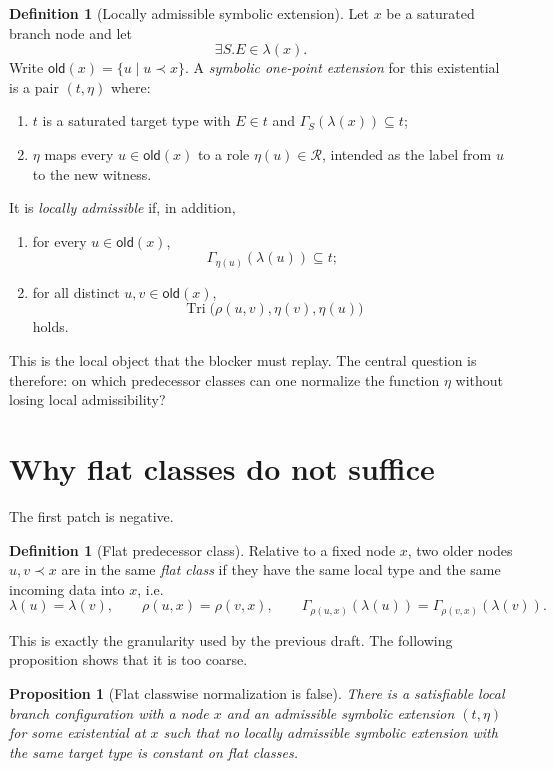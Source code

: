 \documentclass[11pt]{article}
\newtheorem{proposition}[theorem]{Proposition}
\theoremstyle{definition}
\newtheorem{definition}[theorem]{Definition}
\newcommand{\Roles}{\mathcal{R}}
\newcommand{\Tri}{\operatorname{Tri}}
\newcommand{\older}{\mathsf{old}}
\begin{document}
\begin{definition}[Locally admissible symbolic extension]
Let $x$ be a saturated branch node and let
\[
\exists S.E\in \lambda(x).
\]
Write $\older(x)=\{u\mid u\prec x\}$. A \emph{symbolic one-point extension} for this existential is a pair $(t,\eta)$ where:
\begin{enumerate}[label=(\alph*)]
  \item $t$ is a saturated target type with $E\in t$ and $\Gamma_S(\lambda(x))\subseteq t$;
  \item $\eta$ maps every $u\in \older(x)$ to a role $\eta(u)\in\Roles$, intended as the label from $u$ to the new witness.
\end{enumerate}
It is \emph{locally admissible} if, in addition,
\begin{enumerate}[label=(\roman*)]
  \item for every $u\in \older(x)$,
  \[
  \Gamma_{\eta(u)}(\lambda(u))\subseteq t;
  \]
  \item for all distinct $u,v\in\older(x)$,
  \[
  \Tri\bigl(\rho(u,v),\eta(v),\eta(u)\bigr)
  \]
  holds.
\end{enumerate}
\end{definition}

This is the local object that the blocker must replay. The central question is therefore: on which predecessor classes can one normalize the function $\eta$ without losing local admissibility?

\section{Why flat classes do not suffice}\label{sec:flatfails}

The first patch is negative.

\begin{definition}[Flat predecessor class]
Relative to a fixed node $x$, two older nodes $u,v\prec x$ are in the same \emph{flat class} if they have the same local type and the same incoming data into $x$, i.e.
\[
\lambda(u)=\lambda(v),\qquad \rho(u,x)=\rho(v,x),\qquad \Gamma_{\rho(u,x)}(\lambda(u))=\Gamma_{\rho(v,x)}(\lambda(v)).
\]
\end{definition}

This is exactly the granularity used by the previous draft. The following proposition shows that it is too coarse.

\begin{proposition}[Flat classwise normalization is false]\label{prop:flatfalse}
There is a satisfiable local branch configuration with a node $x$ and an admissible symbolic extension $(t,\eta)$ for some existential at $x$ such that no locally admissible symbolic extension with the same target type is constant on flat classes.
\end{proposition}
\end{document}
